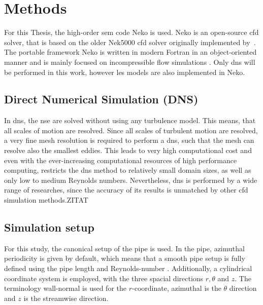 \chapter{Methods}\label{chap: Methods}

For this Thesis, the high-order \acrfull{sem} code Neko is used.
Neko is an open-source \acrfull{cfd} solver, that is based on the older Nek5000 \acrshort{cfd} solver originally implemented by~\cite{fischerNek500WebPage}.
The portable framework Neko is written in modern Fortran in an object-oriented manner and is mainly focused on incompressible flow simulations \citep{janssonNekoModernPortable2024}.
Only \acrfull{dns} will be performed in this work, however \acrfull{les} models are also implemented in Neko.

\section{Direct Numerical Simulation (DNS)}
In \acrshort{dns}, the \acrlong{nse} are solved without using any turbulence model.
This means, that all scales of motion are resolved.
Since all scales of turbulent motion are resolved, a very fine mesh resolution is required to perform a \acrshort{dns}, such that the mesh can resolve also the smallest eddies.
This leads to very high computational cost and even with the ever-increasing computational resources of high performance computing, restricts the \acrshort{dns} method to relatively small domain sizes, as well as only low to medium Reynolds numbers.
Nevertheless, \acrshort{dns} is performed by a wide range of researches, since the accuracy of its results is unmatched by other \acrshort{cfd} simulation methods.ZITAT


\section{Simulation setup}\label{sec: Simulation setup}
For this study, the canonical setup of the pipe is used.
In the pipe, azimuthal periodicity is given by default, which means that a smooth pipe setup is fully defined using the pipe length and Reynolds-number \citep{yaoDirectNumericalSimulations2023}.
Additionally, a cylindrical coordinate system is employed, with the three spacial directions $r, \theta$ and $z$.
The terminology wall-normal is used for the $r$-coordinate, azimuthal is the $\theta$ direction and $z$ is the streamwise direction.

